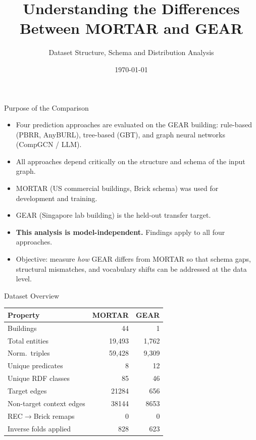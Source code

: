 \documentclass[10pt]{beamer}
\title{Understanding the Differences Between MORTAR and GEAR}
\subtitle{Dataset Structure, Schema and Distribution Analysis}
\date{\today}
\begin{document}
\begin{frame}
  \titlepage
\end{frame}

\begin{frame}{Purpose of the Comparison}
  \begin{itemize}
    \item Four prediction approaches are evaluated on the GEAR building:
          rule-based (PBRR, AnyBURL), tree-based (GBT), and graph neural networks (CompGCN / LLM).
    \item All approaches depend critically on the structure and schema of the input graph.
    \item MORTAR (US commercial buildings, Brick schema) was used for development and training.
    \item GEAR (Singapore lab building) is the held-out transfer target.
    \item \textbf{This analysis is model-independent.} Findings apply to all four approaches.
    \item Objective: measure \emph{how} GEAR differs from MORTAR so that schema gaps,
          structural mismatches, and vocabulary shifts can be addressed at the data level.
  \end{itemize}
\end{frame}

\begin{frame}{Dataset Overview}
  \begin{table}
    \centering
    \begin{tabular}{lrr}
      \toprule
      \textbf{Property} & \textbf{MORTAR} & \textbf{GEAR} \\
      \midrule
Buildings & 44 & 1 \\
Total entities & 19,493 & 1,762 \\
Norm.\ triples & 59,428 & 9,309 \\
Unique predicates & 8 & 12 \\
Unique RDF classes & 85 & 46 \\
Target edges & 21284 & 656 \\
Non-target context edges & 38144 & 8653 \\
REC$\to$Brick remaps & 0 & 0 \\
Inverse folds applied & 828 & 623 \\
      \bottomrule
    \end{tabular}
  \end{table}
\end{frame}
\end{document}
